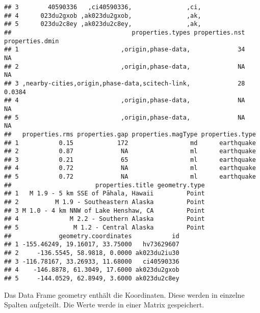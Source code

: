 \documentclass[
]{article}
\newenvironment{Shaded}{\begin{snugshade}}{\end{snugshade}}
\newcommand{\FunctionTok}[1]{\textcolor[rgb]{0.13,0.29,0.53}{\textbf{#1}}}
\newcommand{\NormalTok}[1]{#1}
\newcommand{\OtherTok}[1]{\textcolor[rgb]{0.56,0.35,0.01}{#1}}
\newcommand{\SpecialCharTok}[1]{\textcolor[rgb]{0.81,0.36,0.00}{\textbf{#1}}}
\newcommand{\StringTok}[1]{\textcolor[rgb]{0.31,0.60,0.02}{#1}}
\begin{document}
\begin{verbatim}
## 3        40590336   ,ci40590336,               ,ci,
## 4      023du2gxob ,ak023du2gxob,               ,ak,
## 5      023du2c8ey ,ak023du2c8ey,               ,ak,
##                                 properties.types properties.nst properties.dmin
## 1                            ,origin,phase-data,             34              NA
## 2                            ,origin,phase-data,             NA              NA
## 3 ,nearby-cities,origin,phase-data,scitech-link,             28          0.0384
## 4                            ,origin,phase-data,             NA              NA
## 5                            ,origin,phase-data,             NA              NA
##   properties.rms properties.gap properties.magType properties.type
## 1           0.15            172                 md      earthquake
## 2           0.87             NA                 ml      earthquake
## 3           0.21             65                 ml      earthquake
## 4           0.72             NA                 ml      earthquake
## 5           0.72             NA                 ml      earthquake
##                       properties.title geometry.type
## 1   M 1.9 - 5 km SSE of Pāhala, Hawaii         Point
## 2          M 1.9 - Southeastern Alaska         Point
## 3 M 1.0 - 4 km NNW of Lake Henshaw, CA         Point
## 4              M 2.2 - Southern Alaska         Point
## 5               M 1.2 - Central Alaska         Point
##             geometry.coordinates           id
## 1 -155.46249, 19.16017, 33.75000   hv73629607
## 2     -136.5545, 58.9818, 0.0000 ak023du2iu30
## 3 -116.78167, 33.26933, 11.68000   ci40590336
## 4    -146.8878, 61.3049, 17.6000 ak023du2gxob
## 5     -144.0529, 62.8949, 3.6000 ak023du2c8ey
\end{verbatim}

Das Data Frame geometry enthält die Koordinaten. Diese werden in
einzelne Spalten aufgeteilt. Die Werte werde in einer Matrix
gespeichert.

\begin{Shaded}
\end{Shaded}
\end{document}
